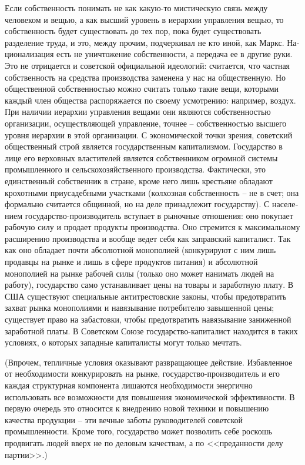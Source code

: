 \documentclass{book}
\begin{document}
Если собственность понимать не как какую-то мистическую связь между человеком и вещью, а как высший уровень в ие­рархии управления вещью, то собственность будет существо­вать до тех пор, пока будет существовать разделение труда, и это, между прочим, подчеркивал не кто иной, как Маркс. На­ционализация есть не уничтожение собственности, а передача ее в другие руки. Это не отрицается и советской официальной идеологий: считается, что частная собственность  на средства производства заменена у нас на общественную.  Но общественной собственностью можно считать только такие вещи, кото­рыми каждый член общества распоряжается по своему усмот­рению: например, воздух. При наличии иерархии управления вещами они являются собственностью организации, осущест­вляющей управление, точнее -- собственностью высшего уров­ня иерархии в этой организации. С экономической точки зре­ния, советский общественный строй является государственным капитализмом. Государство в лице его верховных властите­лей является собственником огромной 
системы промышлен­ного и сельскохозяйственного производства. Фактически, это единственный собственник в стране, кроме него лишь кре­стьяне обладают крохотными приусадебными участками (кол­хозная собственность -- не в счет; она формально считается общинной, но на деле принадлежит государству). С населе­нием государство-производитель вступает в рыночные отно­шения: оно покупает рабочую силу и продает продукты произ­водства. Оно стремится к максимальному расширению произ­водства и вообще ведет себя как заправский капиталист. Так как оно обладает почти абсолютной монополией (конкурируют с ним лишь продавцы на рынке и лишь в сфере продуктов пи­тания) и абсолютной монополией на рынке рабочей силы (толь­ко оно может нанимать людей на работу), государство само устанавливает цены на товары и заработную плату. В США су­ществуют специальные антитрестовские законы, чтобы предот­вратить захват рынка монополиями и навязывание потребите­лю завышенной цены; существует право на забастовки, чтобы предотвратить навязывание 
заниженной заработной платы. В Советском Союзе государство-капиталист находится в таких условиях, о которых западные капиталисты могут только мечтать.

(Впрочем, тепличные условия оказывают развращающее действие. Избавленное от необходимости конкурировать на рынке, государство-производитель и его каждая структурная компонента лишаются необходимости энергично использовать все возможности для повышения экономической эффективности. В первую очередь это относится к внедрению новой техники и повышению качества продукции -- эти вечные заботы руководителей советской промышленности. Кроме того, государство может позволить себе роскошь продвигать людей вверх не по деловым качествам, а по <<преданности делу партии>>.)
\end{document}

